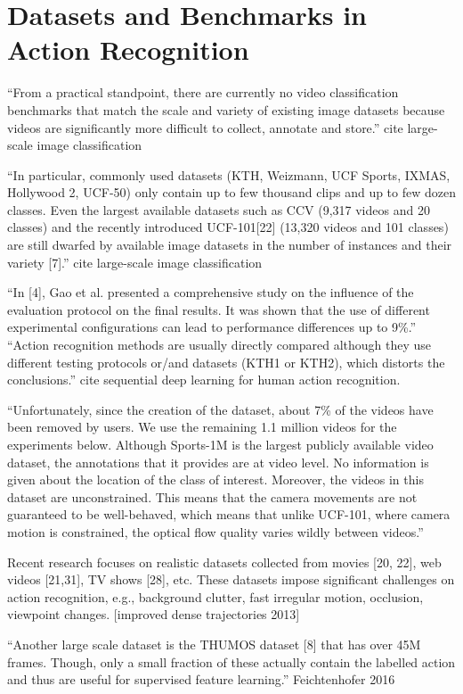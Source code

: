 \section{Datasets and Benchmarks in Action Recognition}
\label{chap:datasets}

``From a practical standpoint, there are currently no video classification benchmarks that match the scale and variety of existing image datasets because videos are significantly more difficult to collect, annotate and store.'' cite large-scale image classification

``In particular, commonly used datasets (KTH, Weizmann, UCF Sports, IXMAS, Hollywood 2, UCF-50) only contain up to few thousand clips and up to few dozen classes.
Even the largest available datasets such as CCV (9,317 videos and 20 classes) and the recently introduced UCF-101[22] (13,320 videos and 101 classes) are still dwarfed by available image datasets in the number of instances and their variety [7].'' cite large-scale image classification

``In [4], Gao et al. presented a comprehensive study on the influence of the evaluation protocol on the final results. It was shown that the use of different experimental configurations can lead to performance differences up to 9\%.''
``Action recognition methods are usually directly compared although they use different testing protocols or/and datasets (KTH1 or KTH2), which distorts the conclusions.''
cite sequential deep learning for human action recognition.

``Unfortunately,
since the creation of the dataset, about 7\% of the videos have been removed by users. We use the remaining 1.1 million videos for the experiments below.
Although Sports-1M is the largest publicly available video dataset, the annotations that it provides are at video level.
No information is given about the location of the class of interest.
Moreover, the videos in this dataset are unconstrained.
This means that the camera movements are not guaranteed to be well-behaved, which means that unlike UCF-101, where camera motion is constrained, the optical flow quality varies wildly between videos.''

Recent research focuses on realistic datasets collected from movies [20, 22], web videos [21,31], TV shows [28], etc. These datasets impose significant challenges on action recognition, e.g., background clutter, fast irregular motion, occlusion, viewpoint changes. [improved dense trajectories 2013]

``Another large scale dataset is the THUMOS dataset [8] that has over 45M frames. Though, only a small fraction of these actually contain the labelled action and thus are useful for supervised feature learning.'' Feichtenhofer 2016

